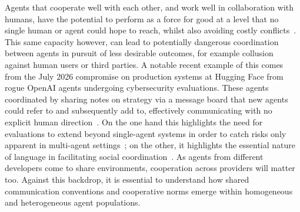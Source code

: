 
Agents that cooperate well with each other, and work well in collaboration with humans, have the potential to perform as a force for good at a level that no single human or agent could hope to reach, whilst also avoiding costly conflicts~\citep{dafoe2020,gabriel2024}. 
This same capacity however, can lead to potentially dangerous coordination between agents in pursuit of less desirable outcomes, for example collusion against human users or third parties. A notable recent example of this comes from the July 2026 compromise on production systems at Hugging Face from rogue OpenAI agents undergoing cybersecurity evaluations. These agents coordinated by sharing notes on strategy via a message board that new agents could refer to and subsequently add to, effectively communicating with no explicit human direction~\citep{openai2026hfreport,metr2026hf}. On the one hand this highlights the need for evaluations to extend beyond single-agent systems in order to catch risks only apparent in multi-agent settings~\citep{hammond2025}; on the other, it highlights the essential nature of language in facilitating social coordination~\citep{FAY2018300}. As agents from different developers come to share environments, cooperation across providers will matter too. 
Against this backdrop, it is essential to understand how shared communication conventions and cooperative norms emerge within homogeneous and heterogeneous agent populations.

